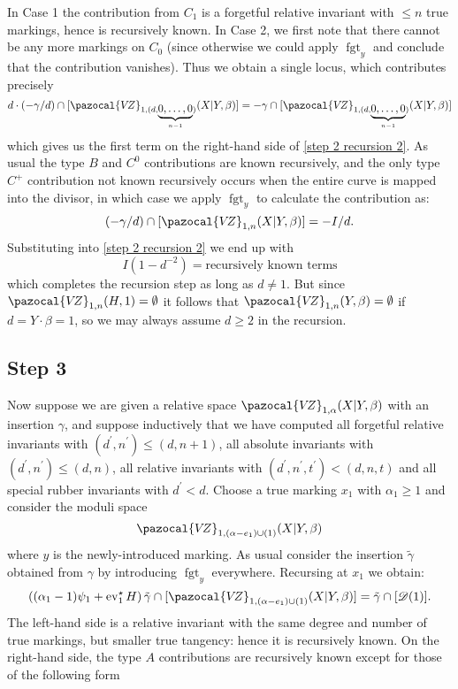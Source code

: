 \documentclass[11pt]{amsart}
\newcommand{\VZ}{\pazocal{V\!Z}}
\newcommand{\st}{\star}
\newcommand{\ev}{\operatorname{ev}}
\newcommand{\fgt}{\operatorname{fgt}}
\newcommand{\Dcal}{\mathcal{D}}
\theoremstyle{definition}
\theoremstyle{definition}
\begin{document}
In Case 1 the contribution from $C_1$ is a forgetful relative invariant with $\leq n$ true markings, hence is recursively known. In Case 2, we first note that there cannot be any more markings on $C_0$ (since otherwise we could apply $\fgt_y$ and conclude that the contribution vanishes). Thus we obtain a single locus, which contributes precisely
\begin{equation*} d\cdot(-\gamma/d) \cap [\VZ_{1,(d,\underbrace{0,\ldots,0}_{n-1})}(X|Y,\beta)] = -\gamma\cap[\VZ_{1,(d,\underbrace{0,\ldots,0}_{n-1})}(X|Y,\beta)]\end{equation*}
which gives us the first term on the right-hand side of \eqref{step 2 recursion 2}. As usual the type $B$ and $C^0$ contributions are known recursively, and the only type $C^+$ contribution not known recursively occurs when the entire curve is mapped into the divisor, in which case we apply $\fgt_y$ to calculate the contribution as:
\begin{equation*} (-\gamma/d) \cap [\VZ_{1,n}(X|Y,\beta)] = -I/d.\end{equation*}
Substituting into \eqref{step 2 recursion 2} we end up with
\begin{equation*} I(1-d^{-2}) = \text{recursively known terms} \end{equation*}
which completes the recursion step as long as $d \neq 1$. But since $\VZ_{1,n}(H,1)=\emptyset$ it follows that $\VZ_{1,n}(Y,\beta)=\emptyset$ if $d=Y\cdot\beta=1$, so we may always assume $d \geq 2$ in the recursion.

\subsection*{Step 3} Now suppose we are given a relative space $\VZ_{1,\alpha}(X|Y,\beta)$ with an insertion $\gamma$, and suppose inductively that we have computed all forgetful relative invariants with $(d^\prime,n^\prime) \leq (d,n+1)$, all absolute invariants with $(d^\prime,n^\prime) \leq (d,n)$, all relative invariants with $(d^\prime,n^\prime,t^\prime)<(d,n,t)$ and all special rubber invariants with $d^\prime < d$. Choose a true marking $x_1$ with $\alpha_1 \geq 1$ and consider the moduli space
\begin{equation*} \VZ_{1,(\alpha-e_1)\cup(1)}(X|Y,\beta) \end{equation*}
where $y$ is the newly-introduced marking. As usual consider the insertion $\tilde\gamma$ obtained from $\gamma$ by introducing $\fgt_y$ everywhere. Recursing at $x_1$ we obtain:
\begin{equation*} \left( (\alpha_1-1)\psi_1 + \ev_1^\st H\right) \tilde\gamma \cap [\VZ_{1,(\alpha-e_1)\cup(1)}(X|Y,\beta)] = \tilde\gamma \cap [\Dcal(1)].\end{equation*}
The left-hand side is a relative invariant with the same degree and number of true markings, but smaller true tangency: hence it is recursively known. On the right-hand side, the type $A$ contributions are recursively known except for those of the following form
\end{document}
